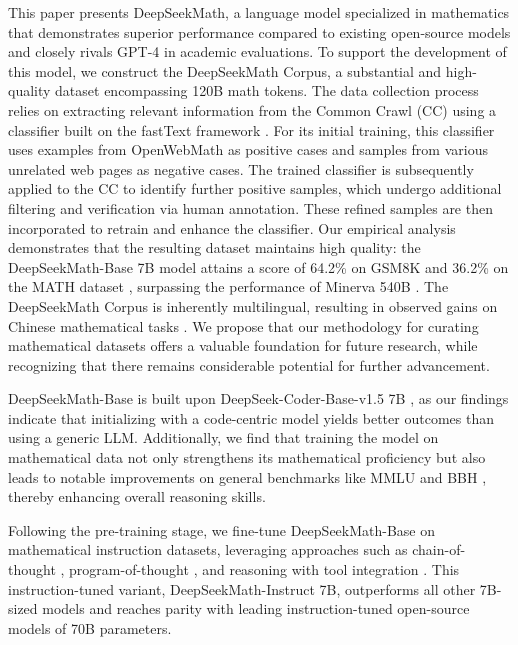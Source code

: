 This paper presents DeepSeekMath, a language model specialized in mathematics that demonstrates superior performance compared to existing open-source models and closely rivals GPT-4 in academic evaluations. To support the development of this model, we construct the DeepSeekMath Corpus, a substantial and high-quality dataset encompassing 120B math tokens. The data collection process relies on extracting relevant information from the Common Crawl (CC) using a classifier built on the fastText framework \citep{joulin2016fasttext}. For its initial training, this classifier uses examples from OpenWebMath \citep{openwebmath} as positive cases and samples from various unrelated web pages as negative cases. The trained classifier is subsequently applied to the CC to identify further positive samples, which undergo additional filtering and verification via human annotation. These refined samples are then incorporated to retrain and enhance the classifier. Our empirical analysis demonstrates that the resulting dataset maintains high quality: the DeepSeekMath-Base 7B model attains a score of 64.2\% on GSM8K \citep{gsm8k} and 36.2\% on the MATH dataset \citep{MATH}, surpassing the performance of Minerva 540B \citep{minerva}. The DeepSeekMath Corpus is inherently multilingual, resulting in observed gains on Chinese mathematical tasks \citep{wei2023cmath,agieval}. We propose that our methodology for curating mathematical datasets offers a valuable foundation for future research, while recognizing that there remains considerable potential for further advancement.

DeepSeekMath-Base is built upon DeepSeek-Coder-Base-v1.5 7B \citep{deepseek-coder}, as our findings indicate that initializing with a code-centric model yields better outcomes than using a generic LLM. Additionally, we find that training the model on mathematical data not only strengthens its mathematical proficiency but also leads to notable improvements on general benchmarks like MMLU \citep{mmlu} and BBH \citep{bbh}, thereby enhancing overall reasoning skills.

Following the pre-training stage, we fine-tune DeepSeekMath-Base on mathematical instruction datasets, leveraging approaches such as chain-of-thought \citep{cot}, program-of-thought \citep{pot,pal}, and reasoning with tool integration \citep{tora}. This instruction-tuned variant, DeepSeekMath-Instruct 7B, outperforms all other 7B-sized models and reaches parity with leading instruction-tuned open-source models of 70B parameters.

